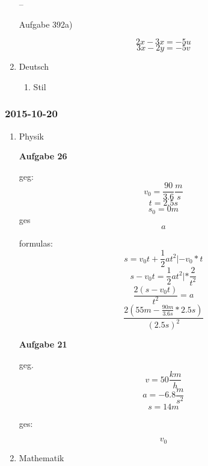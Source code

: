 \documentclass[11pt]{article}
\begin{document}
\begin{enumerate}
--

Aufgabe 392a)

\begin{equation}
2x - 3x = -5u
\end{equation}
\begin{equation}
3x - 2y = -5v
\end{equation}


\item Deutsch
\label{sec-1-2-7-2}
\begin{enumerate}
\item Stil
\label{sec-1-2-7-2-1}
\end{enumerate}
\end{enumerate}

\subsubsection{2015-10-20}
\label{sec-1-2-8}
\begin{enumerate}
\item Physik
\label{sec-1-2-8-1}

\textbf{Aufgabe 26}

geg:
\begin{equation}
v_0 = \frac{90}{3.6}\frac{m}{s}
\end{equation}
\begin{equation}
t = 2.5s
\end{equation}
\begin{equation}
s_0 = 0m
\end{equation}
ges
\begin{equation}
a
\end{equation}

formulas:
\begin{equation}
s = v_0 t + \frac{1}{2}at^2 | -v_0 * t 
\end{equation}
\begin{equation}
s-v_0t = \frac{1}{2}at^2 | *\frac{2}{t^2}
\end{equation}
\begin{equation}
\frac{2(s-v_0t)}{t^2} = a
\end{equation}
\begin{equation}
\frac{2(55m - \frac{90m}{3.6s}*2.5s)}{(2.5s)^2}
\end{equation}

\textbf{Aufgabe 21}

geg.
\begin{equation}
v = 50\frac{km}{h}
\end{equation}
\begin{equation}
a = -6.8\frac{m}{s^2}
\end{equation}
\begin{equation}
s = 14m
\end{equation}

ges:

\begin{equation}
v_0
\end{equation}

\item Mathematik
\label{sec-1-2-8-2}
\end{enumerate}
\end{document}
